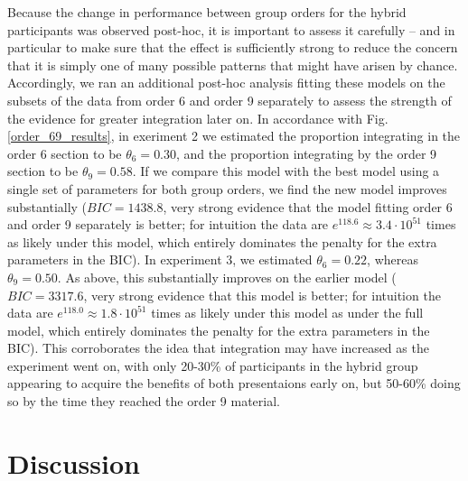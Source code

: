 \documentclass[man,10pt]{apa6}
\begin{document}
Because the change in performance between group orders for the hybrid participants was observed post-hoc, it is important to assess it carefully -- and in particular to make sure that the effect is sufficiently strong to reduce the concern that it is simply one of many possible patterns that might have arisen by chance. Accordingly, we ran an additional post-hoc analysis fitting these models on the subsets of the data from order 6 and order 9 separately to assess the strength of the evidence for greater integration later on. In accordance with Fig. \ref{order_69_results}, in exeriment 2 we estimated the proportion integrating in the order 6 section to be $\theta_6 = 0.30$, and the proportion integrating by the order 9 section to be $\theta_9 = 0.58$. If we compare this model with the best model using a single set of parameters for both group orders, we find the new model improves substantially ($BIC = 1438.8$, very strong evidence that the model fitting order 6 and order 9 separately is better; for intuition the data are $e^{118.6} \approx 3.4 \cdot 10^{51}$ times as likely under this model, which entirely dominates the penalty for the extra parameters in the BIC). In experiment 3, we estimated $\theta_6 = 0.22$, whereas $\theta_9 = 0.50$. As above, this substantially improves on the earlier model ($BIC=3317.6$, very strong evidence that this model is better; for intuition the data are $e^{118.0} \approx 1.8 \cdot 10^{51}$ times as likely under this model as under the full model, which entirely dominates the penalty for the extra parameters in the BIC). This corroborates the idea that integration may have increased as the experiment went on, with only 20-30\% of participants in the hybrid group appearing to acquire the benefits of both presentaions early on, but 50-60\% doing so by the time they reached the order 9 material.
\section{Discussion}
\end{document}
